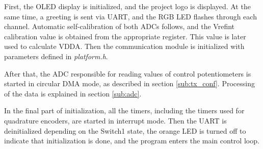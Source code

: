 First, the OLED display is initialized, and the project logo is displayed. At the same time, a greeting is sent via UART, and the RGB LED flashes through each channel. Automatic self-calibration of both ADCs follows, and the Vrefint calibration value is obtained from the appropriate register. This value is later used to calculate VDDA. Then the communication module is initialized with parameters defined in \textit{platform.h}.

After that, the ADC responsible for reading values of control potentiometers is started in circular DMA mode, as described in section \ref{sub:tx_conf}. Processing of the data is explained in section \ref{sub:adc}.

In the final part of initialization, all the timers, including the timers used for quadrature encoders, are started in interrupt mode. Then the UART is deinitialized depending on the Switch1 state, the orange LED is turned off to indicate that initialization is done, and the program enters the main control loop.

